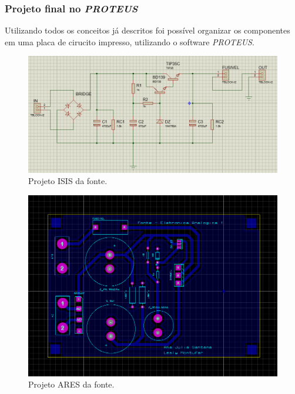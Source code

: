 \documentclass[a4paper,12pt,oneside,openany,table,xcdraw]{article}
\begin{document}
\subsubsection{Projeto final no \emph{PROTEUS}}
Utilizando todos os conceitos já descritos foi possível organizar os componentes em uma placa de cirucito impresso, utilizando o software \emph{PROTEUS}.
\begin{figure}[H]
\centering
\captionsetup{font=scriptsize}
\includegraphics[width=15cm]{isis}
\caption{Projeto ISIS da fonte.}
\label{isis}
\end{figure}

\begin{figure}[H]
\centering
\captionsetup{font=scriptsize}
\includegraphics[width=15cm]{ares}
\caption{Projeto ARES da fonte.}
\label{ares}
\end{figure}
\end{document}
